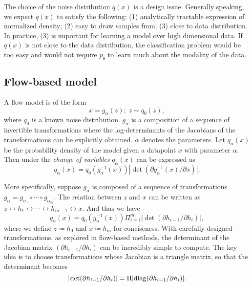 \documentclass[10pt,twocolumn,letterpaper]{article}
\begin{document}
The choice of the noise distribution $q(x)$ is a design issue. Generally speaking, we expect $q(x)$ to satisfy the following: (1) analytically tractable expression of normalized density; (2) easy to draw samples from; (3) close to data distribution. In practice, (3) is important for learning a model over high dimensional data. If $q(x)$ is not close to the data distribution, the classification problem would be too easy and would not require $p_\theta$ to learn much about the modality of the data. 

\subsection{Flow-based model}
\label{sect: flow}
A flow model is of the form 
 \begin{equation} 
 x = g_\alpha(z); \; z \sim q_0(z),
 \end{equation}
where $q_0$ is a known noise distribution. $g_\alpha$ is a composition of a sequence of invertible transformations where the log-determinants of the Jacobians of the transformations can be explicitly obtained.  $\alpha$ denotes the parameters. Let $q_\alpha(x)$ be the probability density of the model given a datapoint $x$ with parameter $\alpha$. Then under the \emph{change of variables} $q_\alpha(x)$ can be expressed as
\begin{equation}
q_\alpha(x) = q_0(g_\alpha^{-1}(x))|\det(\partial g_\alpha^{-1}(x)/\partial x)|. 
\end{equation}

More specifically, suppose $g_\alpha$ is composed of a sequence of transformations $g_\alpha = g_{\alpha_1} \circ \cdots \circ g_{\alpha_m}$. The relation between $z$ and $x$ can be written as $z \leftrightarrow h_1 \leftrightarrow \cdots \leftrightarrow h_{m-1}\leftrightarrow x$. And thus we have 
\begin{equation}
	q_\alpha(x) = q_0(g_\alpha^{-1}(x)) \Pi_{i=1}^m |\det(\partial h_{i-1} / \partial h_i)|,
\end{equation}
where we define $z \coloneqq h_0$ and $x \coloneqq h_m$ for conciseness. With carefully designed transformations, as explored in flow-based methods, the determinant of the Jacobian matrix $(\partial h_{i-1} / \partial h_i)$ can be incredibly simple to compute. The key idea is to choose transformations whose Jacobian is a triangle matrix, so that the determinant becomes 
\begin{equation}
	|\det(\partial h_{i-1} / \partial h_i)| = \Pi|{\rm diag}(\partial h_{i-1} / \partial h_{i})|. 
\end{equation}
\end{document}
